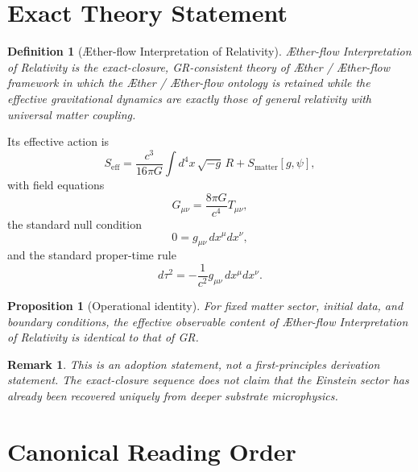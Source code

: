 \documentclass[11pt]{article}
\newcommand{\Aether}{\AE{}ther}
\newcommand{\Aflow}{\AE{}ther-flow}
\newcommand{\TheoryName}{\Aflow{} Interpretation of Relativity}
\newcommand{\TheoryProgram}{\Aether{} / \Aflow{} framework}
\newtheorem{definition}{Definition}
\newtheorem{proposition}{Proposition}
\newtheorem{remark}{Remark}
\begin{document}
\section{Exact Theory Statement}

\begin{definition}[\TheoryName{}]
\TheoryName{} is the exact-closure, GR-consistent theory of \TheoryProgram{} in which the \Aether{} / \Aflow{} ontology is retained while the effective gravitational dynamics are exactly those of general relativity with universal matter coupling.
\end{definition}

Its effective action is
\begin{equation}
S_{\mathrm{eff}}
=
\frac{c^3}{16\pi G}\int d^4x\,\sqrt{-g}\,R
+
S_{\mathrm{matter}}[g,\psi],
\label{eq:SA}
\end{equation}
with field equations
\begin{equation}
G_{\mu\nu}
=
\frac{8\pi G}{c^4}T_{\mu\nu},
\label{eq:einstein}
\end{equation}
the standard null condition
\begin{equation}
0=g_{\mu\nu}\,dx^\mu dx^\nu,
\label{eq:null}
\end{equation}
and the standard proper-time rule
\begin{equation}
d\tau^2=-\frac{1}{c^2}g_{\mu\nu}\,dx^\mu dx^\nu.
\label{eq:propertime}
\end{equation}

\begin{proposition}[Operational identity]
For fixed matter sector, initial data, and boundary conditions, the effective observable content of \TheoryName{} is identical to that of GR.
\end{proposition}

\begin{remark}
This is an adoption statement, not a first-principles derivation statement. The exact-closure sequence does not claim that the Einstein sector has already been recovered uniquely from deeper substrate microphysics.
\end{remark}

\section{Canonical Reading Order}
\end{document}
